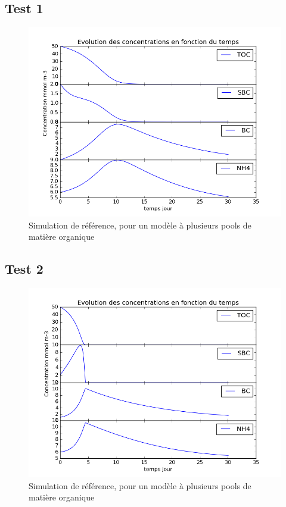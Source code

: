 \subsection{Test 1}

\begin{figure}[h!]
  \includegraphics[width=\textwidth]{partie1/Test1.png}
  \caption{Simulation de r\'ef\'erence, pour un mod\`ele \`a plusieurs pools de mati\`ere organique
  }
  \label{fig:partie1test1}
\end{figure}

\subsection{Test 2}

\begin{figure}[h!]
  \includegraphics[width=\textwidth]{partie1/Test2.png}
  \caption{Simulation de r\'ef\'erence, pour un mod\`ele \`a plusieurs pools de mati\`ere organique
  }
  \label{fig:partie1test2}
\end{figure}

